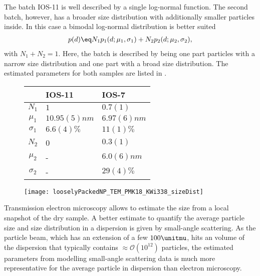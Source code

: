 \documentclass[\main/dresen_thesis.tex]{subfiles}
\begin{document}
The batch IOS-11 is well described by a single log-normal function. The second batch, however, has a broader size distribution with additionally smaller particles inside.
In this case a bimodal log-normal distribution is better suited
\begin{align}
  p(d) \eq N_1 p_1(d; \mu_1, \sigma_1) + N_2 p_2(d; \mu_2, \sigma_2),
\end{align}
with $N_1 + N_2 = 1$.
Here, the batch is described by being one part particles with a narrow size distribution and one part with a broad size distribution.
The estimated parameters for both samples are listed in .
\begin{figure}[tb]
    \centering
    \begin{minipage}{0.49\textwidth}
      \centering
      \begin{tabular}{ c | l | l }
          & IOS-11 & IOS-7 \\
        \hline
        $N_1$       & $1$                   & $0.7(1)$   \\
        $\mu_1$     & $10.95(5) \unit{nm}$  & $6.97(6) \unit{nm}$ \\
        $\sigma_1$  & $6.6(4) \unit{\%}$    & $11(1) \unit{\%}$ \\
        $N_2$       & 0                     & $0.3(1)$  \\
        $\mu_2$     & -                     & $6.0(6) \unit{nm}$ \\
        $\sigma_2$  & -                     & $29(4) \unit{\%}$ \\
        \hline
      \end{tabular}
    \end{minipage}
    \begin{minipage}{0.49\textwidth}
      \centering
      \texttt{[image: looselyPackedNP\_TEM\_PMK18\_KWi338\_sizeDist]}
    \end{minipage}
\end{figure}

Transmission electron microscopy allows to estimate the size from a local snapshot of the dry sample.
A better estimate to quantify the average particle size and size distribution in a dispersion is given by small-angle scattering.
As the particle beam, which has an extension of a few $100 \unitmu$, hits an volume of the dispersion that typically contains $\approx \mathcal{O} (10^{12})$ particles, the estimated parameters from modelling small-angle scattering data is much more representative for the average particle in dispersion than electron microscopy.
\end{document}
